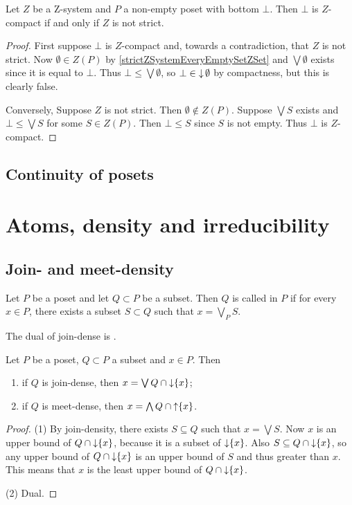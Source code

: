 \begin{lemma}
Let $Z$ be a $\mathrm{Z}$-system and $P$ a non-empty poset with bottom $\bot$. Then $\bot$ is $Z$-compact \textup{if and only if} $Z$ is not strict. 
\end{lemma}
\begin{proof}
First suppose $\bot$ is $Z$-compact and, towards a contradiction, that $Z$ is not strict. Now $\emptyset \in Z(P)$ by \ref{strictZSystemEveryEmptySetZSet} and $\bigvee \emptyset$ exists since it is equal to $\bot$. Thus $\bot \leq \bigvee \emptyset$, so $\bot \in \operatorname{\downarrow} \emptyset$ by compactness, but this is clearly false.

Conversely, Suppose $Z$ is not strict. Then $\emptyset\notin Z(P)$. Suppose $\bigvee S$ exists and $\bot \leq \bigvee S$ for some $S\in Z(P)$. Then $\bot \leq S$ since $S$ is not empty. Thus $\bot$ is $Z$-compact.
\end{proof}

\subsection{Continuity of posets}

\section{Atoms, density and irreducibility}
\subsection{Join- and meet-density}
\begin{definition}
Let $P$ be a poset and let $Q\subset P$ be a subset. Then $Q$ is called  in $P$ if for every $x\in P$, there exists a subset $S\subset Q$ such that $x= \bigvee_P S$.

The dual of join-dense is .
\end{definition}

\begin{lemma}
Let $P$ be a poset, $Q\subset P$ a subset and $x\in P$. Then
\begin{enumerate}
\item if $Q$ is join-dense, then $x = \bigvee Q\cap \operatorname{\downarrow}\{x\}$;
\item if $Q$ is meet-dense, then $x = \bigwedge Q\cap \operatorname{\uparrow}\{x\}$.
\end{enumerate}
\end{lemma}
\begin{proof}
(1) By join-density, there exists $S\subseteq Q$ such that $x = \bigvee S$. Now $x$ is an upper bound of $Q\cap \operatorname{\downarrow}\{x\}$, because it is a subset of $\operatorname{\downarrow}\{x\}$. Also $S\subseteq Q\cap \operatorname{\downarrow}\{x\}$, so any upper bound of $Q\cap \operatorname{\downarrow}\{x\}$ is an upper bound of $S$ and thus greater than $x$. This means that $x$ is the least upper bound of $Q\cap \operatorname{\downarrow}\{x\}$.

(2) Dual.
\end{proof}

